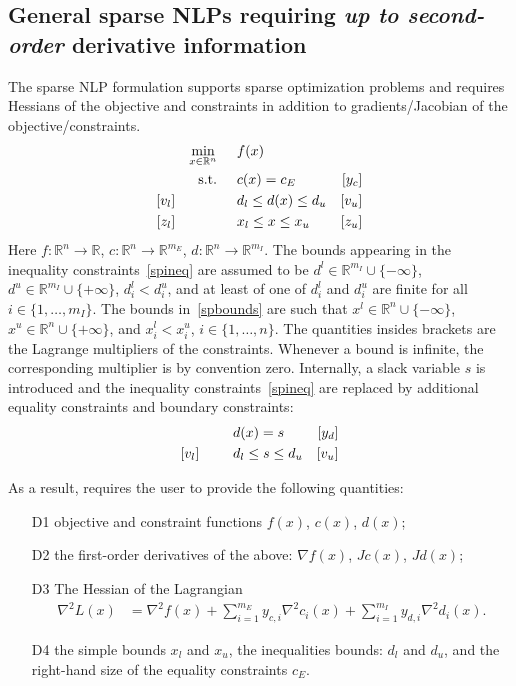 \subsection{General sparse NLPs requiring \textit{up to second-order} derivative information}
The sparse NLP formulation supports sparse optimization problems and requires Hessians of the objective and constraints in addition to gradients/Jacobian of the objective/constraints.
\begin{align}
&&&&\min_{x\in\mathbb{R}^n} & \hspace{0.5cm} f(x) &&&& \label{spobj}\\
&&&&\textnormal{s.t.} &\hspace{0.5cm}  c(x)=c_E &[y_c]&&&\\
&&[v_l]&&& \hspace{0.5cm} d_l \leq d(x) \leq d_u  &[v_u]&&&\label{spineq} \\
&&[z_l]&&& \hspace{0.5cm} x_l \leq x \leq x_u & [z_u] &&&\label{spbounds}
\end{align}
Here $f:\mathbb{R}^n\rightarrow\mathbb{R}$, $c:\mathbb{R}^n\rightarrow\mathbb{R}^{m_E}$, $d:\mathbb{R}^n\rightarrow\mathbb{R}^{m_I}$. The bounds appearing in the inequality constraints~\eqref{spineq} are assumed to be $d^l\in\mathbb{R}^{m_I}\cup\{-\infty\}$, $d^u\in\mathbb{R}^{m_I}\cup\{+\infty\}$, $d_i^l < d_i^u$, and at least of one of $d_i^l$ and $d_i^u$ are finite for all $i\in\{1,\ldots,m_I\}$. The bounds in~\eqref{spbounds} are such that $x^l\in\mathbb{R}^{n}\cup\{-\infty\}$, $x^u\in\mathbb{R}^{n}\cup\{+\infty\}$, and $x_i^l < x_i^u$, $i\in\{1,\ldots,n\}$. The quantities insides brackets are the Lagrange multipliers of the constraints. Whenever a bound is infinite, the corresponding multiplier is by convention zero.
Internally, a slack variable $s$ is introduced and the inequality constraints~\eqref{spineq} are replaced by additional equality constraints and boundary constraints:
\begin{align}
&&&&& \hspace{0.5cm} d(x) = s &[y_d]&&& \\
&&[v_l]&&& \hspace{0.5cm} d_l \leq s \leq d_u  &[v_u]&&&\label{spineq_s} 
\end{align}

As a result, \Hi requires the user to provide the following quantities:
\begin{itemize}
\item[D1] objective and constraint functions $f(x)$, $c(x)$, $d(x)$;
\item[D2] the first-order derivatives of the above: $\nabla f(x)$, $Jc(x)$, $Jd(x)$;
\item[D3] The Hessian of the Lagrangian
  \begin{align}
\nabla^2 L(x)& = \nabla^2 f(x) + \sum_{i=1}^{m_E} y_{c,i} \nabla^2 c_i(x) + \sum_{i=1}^{m_I} y_{d,i} \nabla^2 d_i(x).\label{spHess}
\end{align}
\item[D4] the simple bounds $x_l$ and $x_u$, the inequalities bounds: $d_l$ and $d_u$, and the right-hand size of the equality constraints $c_E$.
\end{itemize}

